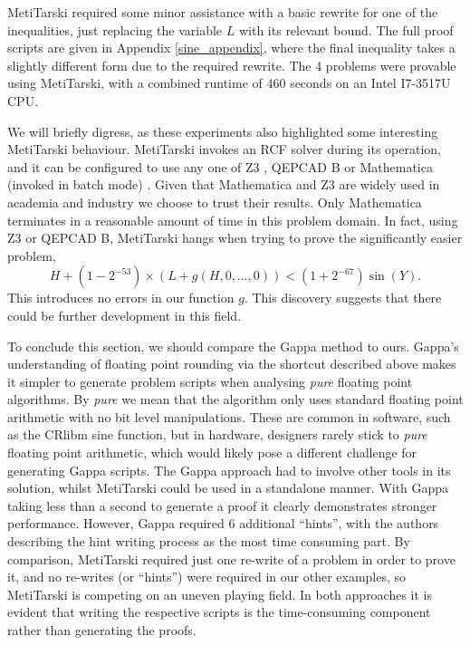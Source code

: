\documentclass{fac}
\begin{document}
MetiTarski required some minor assistance with a basic rewrite for one of the inequalities, just replacing the variable $L$ with its relevant bound. The full proof scripts are given in Appendix \ref{sine_appendix}, where the final inequality takes a slightly different form due to the required rewrite. The 4 problems were provable using MetiTarski, with a combined runtime of 460 seconds on an Intel I7-3517U CPU. 

We will briefly digress, as these experiments also highlighted some interesting MetiTarski behaviour. MetiTarski invokes an RCF solver during its operation, and it can be configured to use any one of Z3 \cite{de2008z3}, QEPCAD B \cite{brown2003qepcad} or Mathematica (invoked in batch mode) \cite{Mathematica}. Given that Mathematica and Z3 are widely used in academia and industry we choose to trust their results. Only Mathematica terminates in a reasonable amount of time in this problem domain. In fact, using Z3 or QEPCAD B, MetiTarski hangs when trying to prove the significantly easier problem,
\begin{equation}
    H + (1-2^{-53})\times(L+g(H,0,...,0)) < (1+2^{-67})\sin{(Y)}.
\end{equation}
This introduces no errors in our function $g$. This discovery suggests that there could be further development in this field. 

To conclude this section, we should compare the Gappa method to ours. Gappa's understanding of floating point rounding via the shortcut described above makes it simpler to generate problem scripts when analysing \textit{pure} floating point algorithms. By \textit{pure} we mean that the algorithm only uses standard floating point arithmetic with no bit level manipulations. These are common in software, such as the CRlibm sine function, but in hardware, designers rarely stick to \textit{pure} floating point arithmetic, which would likely pose a different challenge for generating Gappa scripts. The Gappa approach had to involve other tools in its solution, whilst MetiTarski could be used in a standalone manner. With Gappa taking less than a second to generate a proof it clearly demonstrates stronger performance. However, Gappa required 6 additional ``hints'', with the authors describing the hint writing process as the most time consuming part. By comparison, MetiTarski required just one re-write of a problem in order to prove it, and no re-writes (or ``hints'') were required in our other examples, so MetiTarski is competing on an uneven playing field. In both approaches it is evident that writing the respective scripts is the time-consuming component rather than generating the proofs.
\end{document}
